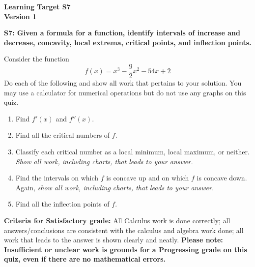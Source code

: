 \documentclass[10pt]{article}
\begin{document}
	\vspace*{0in}

		\begin{center}
			\textbf{Learning Target S7 \\
			Version 1} 
		\end{center}


\begin{framed}
	\textbf{S7: Given a formula for a function, identify intervals of increase and decrease, concavity, local extrema, critical points, and inflection points.}
\end{framed}

Consider the function 
$$f(x) = x^3 - \frac{9}{2}x^2 - 54x + 2$$
Do each of the following and show all work that pertains to your solution. You may use a calculator for numerical operations but do not use any graphs on this quiz. 
\begin{enumerate}
    \item Find $f'(x)$ and $f''(x)$. 
    \item Find all the critical numbers of $f$.
    \item Classify each critical number as a local minimum, local maximum, or neither. \emph{Show all work, including charts, that leads to your answer.} 
    \item Find the intervals on which $f$ is concave up and on which $f$ is concave down. Again, \emph{show all work, including charts, that leads to your answer.} 
    \item Find all the inflection points of $f$. 
\end{enumerate}

\vfill


\begin{small}
    \begin{framed}
        	\textbf{Criteria for Satisfactory grade:} All Calculus work is done correctly; all answers/conclusions are consistent with the calculus and algebra work done; all work that leads to the answer is shown clearly and neatly. \textbf{Please note: Insufficient or unclear work is grounds for a Progressing grade on this quiz, even if there are no mathematical errors.}
    \end{framed}

\end{small}
\end{document}
